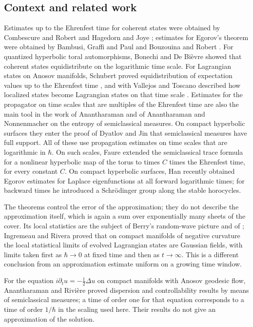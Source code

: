 \documentclass[twoside,10pt]{article}
\numberwithin{equation}{section}
\theoremstyle{slbody}
\theoremstyle{remark}
\begin{document}
\subsection{Context and related work}\label{subsec:context}
Estimates up to the Ehrenfest time for coherent states were obtained by Combescure and Robert \cite{CR97} and
Hagedorn and Joye \cite{HJ00}; estimates for Egorov's theorem were obtained by Bambusi, Graffi and
Paul \cite{BGP99} and Bouzouina and Robert \cite{BR02}. For quantized
hyperbolic toral automorphisms, Bonechi and De Bi\`evre \cite{BdB00} showed that
coherent states equidistribute on the logarithmic time scale. For Lagrangian
states on Anosov manifolds, Schubert proved equidistribution of expectation
values up to the Ehrenfest time \cite{Sch05}, and with Vallejos and Toscano
described how localized states become Lagrangian states on that time scale
\cite{STV12}. Estimates for the propagator on time scales that are multiples of the
Ehrenfest time are also the main tool in the work of Anantharaman \cite{Ana08} and of
Anantharaman and Nonnenmacher \cite{AN07} on the entropy of semiclassical measures.
On compact hyperbolic surfaces they enter the proof of Dyatlov and Jin \cite{DJ18} that
semiclassical measures have full support. All of these use propagation estimates on time
scales that are logarithmic in $\hbar$. On such scales, Faure \cite{Fau07} extended the semiclassical
trace formula for a nonlinear hyperbolic map of the torus to times $C$ times the Ehrenfest
time, for every constant $C$. On compact hyperbolic surfaces, Han \cite{Han26} recently obtained
Egorov estimates for Laplace eigenfunctions at all forward logarithmic times; for backward times
he introduced a Schr\"odinger group along the stable horocycles.

The theorems control the error of the approximation; they do not describe the approximation itself, which is again a
sum over exponentially many sheets of the cover. Its local statistics are the subject of Berry's random-wave picture
\cite{Ber77} and of \cite{BB79}; Ingremeau and Rivera \cite{IR22} proved that on compact manifolds of negative curvature the
local statistical limits of evolved Lagrangian states are Gaussian fields, with limits taken first as $\hbar\to0$ at fixed
time and then as $t\to\infty$. This is a different conclusion from an approximation estimate uniform on a growing time window.

For the equation $i\partial_tu=-\tfrac12\Delta u$ on compact
manifolds with Anosov geodesic flow, Anantharaman and Rivi\`ere \cite{AR12} proved dispersion
and controllability results by means of semiclassical measures; a time of order one for
that equation corresponds to a time of order $1/\hbar$ in the scaling used here. Their results
do not give an approximation of the solution.
\end{document}

